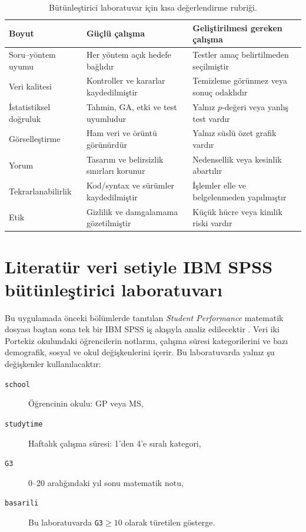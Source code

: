 \begin{table}[htbp]
\centering
\caption{Bütünleştirici laboratuvar için kısa değerlendirme rubriği.}
\begingroup\scriptsize
\begin{tabular}{@{}p{}p{}p{}@{}}
\toprule
Boyut & Güçlü çalışma & Geliştirilmesi gereken çalışma \\
\midrule
Soru--yöntem uyumu & Her yöntem açık hedefe bağlıdır & Testler amaç belirtilmeden seçilmiştir \\
Veri kalitesi & Kontroller ve kararlar kaydedilmiştir & Temizleme görünmez veya sonuç odaklıdır \\
İstatistiksel doğruluk & Tahmin, GA, etki ve test uyumludur & Yalnız $p$-değeri veya yanlış test vardır \\
Görselleştirme & Ham veri ve örüntü görünürdür & Yalnız süslü özet grafik vardır \\
Yorum & Tasarım ve belirsizlik sınırları korunur & Nedensellik veya kesinlik abartılır \\
Tekrarlanabilirlik & Kod/syntax ve sürümler kaydedilmiştir & İşlemler elle ve belgelenmeden yapılmıştır \\
Etik & Gizlilik ve damgalamama gözetilmiştir & Küçük hücre veya kimlik riski vardır \\
\bottomrule
\end{tabular}
\endgroup
\end{table}

\section{Literatür veri setiyle IBM SPSS bütünleştirici laboratuvarı}

Bu uygulamada önceki bölümlerde tanıtılan \emph{Student Performance}
matematik dosyası baştan sona tek bir IBM SPSS iş akışıyla analiz edilecektir
\cite{cortez2008data,cortezsilva2008}. Veri iki Portekiz okulundaki
öğrencilerin notlarını, çalışma süresi kategorilerini ve bazı demografik,
sosyal ve okul değişkenlerini içerir. Bu laboratuvarda yalnız şu değişkenler
kullanılacaktır:

\begin{description}
  \item[\textnormal{\texttt{school}}] Öğrencinin okulu: GP veya MS,
  \item[\textnormal{\texttt{studytime}}] Haftalık çalışma süresi: 1'den 4'e sıralı kategori,
  \item[\textnormal{\texttt{G3}}] 0--20 aralığındaki yıl sonu matematik notu,
  \item[\textnormal{\texttt{basarili}}] Bu laboratuvarda \texttt{G3}$\geq10$ olarak türetilen gösterge.
\end{description}

